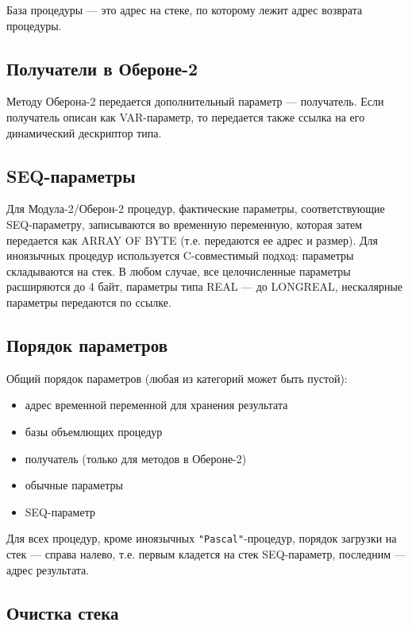 База процедуры --- это адрес на стеке, по которому лежит адрес возврата
процедуры.

\subsection{Получатели в Обероне-2}

Методу Оберона-2 передается дополнительный параметр --- получатель.
Если получатель описан как VAR-параметр, то передается также ссылка
на его динамический дескриптор типа.

\subsection{SEQ-параметры}

Для Модула-2/Оберон-2 процедур, фактические параметры, соответствующие 
SEQ-параметру, записываются во временную переменную, которая затем 
передается как ARRAY OF BYTE
(т.е. передаются ее адрес и размер). Для иноязычных процедур 
используется C-совместимый подход: параметры складываются на стек.
В любом случае, все целочисленные параметры расширяются до 4 байт,
параметры типа REAL --- до LONGREAL,
нескалярные параметры передаются по ссылке.

\subsection{Порядок параметров}

Общий порядок параметров (любая из категорий может быть пустой):

\begin{itemize}
\item адрес временной переменной для хранения результата %
\item базы объемлющих процедур
\item получатель (только для методов в Обероне-2)
\item обычные параметры
\item SEQ-параметр
\end{itemize}

Для всех процедур, кроме иноязычных \verb'"Pascal"'-процедур,
порядок загрузки на стек --- справа налево, т.е. первым кладется на стек
SEQ-параметр, последним --- адрес результата.

\subsection{Очистка стека}

